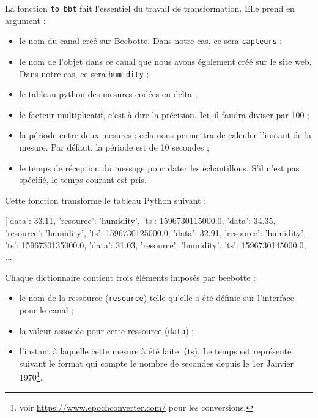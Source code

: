 
La fonction \texttt{to\_bbt} fait l’essentiel du travail de transformation. Elle prend en argument :

\begin{itemize}
    \item le nom du canal créé sur Beebotte. Dans notre cas, ce sera \texttt{capteurs} ;
    \item le nom de l’objet dans ce canal que nous avons également créé sur le site web. Dans notre cas, ce sera \texttt{humidity} ;
    \item le tableau python des mesures codées en delta ;
    \item le facteur multiplicatif, c’est-à-dire la précision. Ici, il faudra diviser par 100 ;
    \item la période entre deux mesures ; cela nous permettra de calculer l’instant de la mesure. Par défaut, la période est de 10 secondes ;
    \item le temps de réception du message pour dater les échantillons. S’il n’est pas spécifié, le temps courant est pris.

\end{itemize}

       \vspace{1em}

Cette fonction transforme le tableau Python suivant :
\begin{termc}[backgroundcolor=\color{palerod}, language=json, basicstyle=\ttfamily\small, escapechar=#]
[3311, 124, -144, -188, -94, 289, -1, -72, 1 ...
\end{termc}

en un tableau de dictionnaire :

\begin{termc}[backgroundcolor=\color{palerod}, language=json, basicstyle=\ttfamily\small, escapechar=#]
[{'data': 33.11, 'resource': 'humidity', 'ts': 1596730115000.0},
 {'data': 34.35, 'resource': 'humidity', 'ts': 1596730125000.0},
 {'data': 32.91, 'resource': 'humidity', 'ts': 1596730135000.0},
 {'data': 31.03, 'resource': 'humidity', 'ts': 1596730145000.0},
 ...
\end{termc}

       \vspace{1em}

Chaque dictionnaire contient trois éléments imposés par beebotte :

\begin{itemize}
\item le nom de la ressource (\texttt{resource}) telle qu’elle a été définie sur l’interface pour le canal ;
\item la valeur associée pour cette ressource (\texttt{data}) ;
\item l’instant à laquelle cette mesure à été faite\texttt{ (}ts). Le temps est représenté suivant le format  qui compte le nombre de secondes depuis le 1er Janvier 1970\footnote{voir \url{https://www.epochconverter.com/} pour les conversions.}.
\end{itemize}

